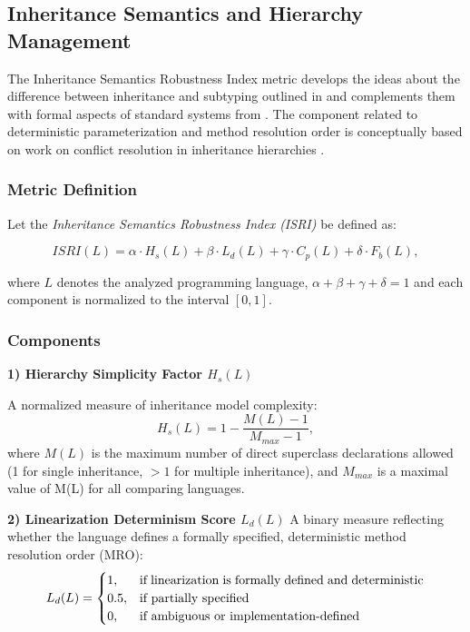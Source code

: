 \subsection{Inheritance Semantics and Hierarchy Management}

The Inheritance Semantics Robustness Index metric develops the ideas about the difference between inheritance and subtyping outlined in \cite{cook1989inheritance} and complements them with formal aspects of standard systems from \cite{cardelli1985understanding, pierce2002types}. The component related to deterministic parameterization and method resolution order is conceptually based on work on conflict resolution in inheritance hierarchies \cite{scharli2003traits}.

\subsubsection{Metric Definition}

Let the \textit{Inheritance Semantics Robustness Index (ISRI)} be defined as:

\[
    ISRI(L) =
    \alpha \cdot H_s(L) +
    \beta \cdot L_d(L) +
    \gamma \cdot C_p(L) +
    \delta \cdot F_b(L),
\]

where $L$ denotes the analyzed programming language, $\alpha + \beta + \gamma + \delta = 1$ and each component is normalized to the interval $[0,1]$.

\subsubsection{Components}

\textbf{1) Hierarchy Simplicity Factor $H_s(L)$}

A normalized measure of inheritance model complexity:
\[
    H_s(L) = 1 - \frac{M(L) - 1}{M_{max} - 1},
\]
where $M(L)$ is the maximum number of direct superclass declarations allowed (1 for single inheritance, $>1$ for multiple inheritance), and $M_{max}$ is a maximal value of M(L) for all comparing languages.


\textbf{2) Linearization Determinism Score $L_d(L)$}
A binary measure reflecting whether the language defines a formally specified, deterministic method resolution order (MRO):
\[
    L_d(L) =
    \begin{cases}
        1, & \text{\parbox[t]{0.65\linewidth}{\raggedright
            if linearization is formally defined and deterministic%
         }} \\
        0.5, & \text{\parbox[t]{0.65\linewidth}{\raggedright
            if partially specified%
         }} \\
        0, & \text{\parbox[t]{0.65\linewidth}{\raggedright
            if ambiguous or implementation-defined%
         }}
    \end{cases}
\]


